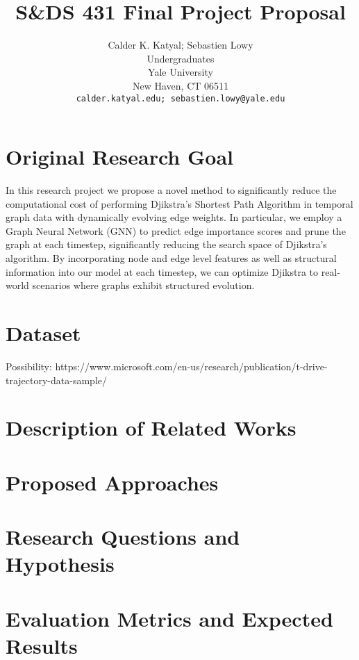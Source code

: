 \documentclass{article}
\title{S\&DS 431 Final Project Proposal}
\author{%
  Calder K. Katyal; Sebastien Lowy\\
  Undergraduates\\
  Yale University\\
  New Haven, CT 06511 \\
  \texttt{calder.katyal.edu; sebastien.lowy@yale.edu} \\
}
\begin{document}
\maketitle

\section{Original Research Goal}

In this research project we propose a novel method to significantly reduce the computational cost of performing Djikstra's Shortest Path Algorithm in temporal graph data with dynamically evolving edge weights. In particular, we employ a Graph Neural Network (GNN) to predict edge importance scores and prune the graph at each timestep, significantly reducing the search space of Djikstra's algorithm. By incorporating node and edge level features as well as structural information into our model at each timestep, we can optimize Djikstra to real-world scenarios where graphs exhibit structured evolution. 

\section{Dataset}

Possibility: https://www.microsoft.com/en-us/research/publication/t-drive-trajectory-data-sample/

\section{Description of Related Works}

\section{Proposed Approaches}

\section{Research Questions and Hypothesis}

\section{Evaluation Metrics and Expected Results}

\FloatBarrier

\newpage

\small


\end{document}
